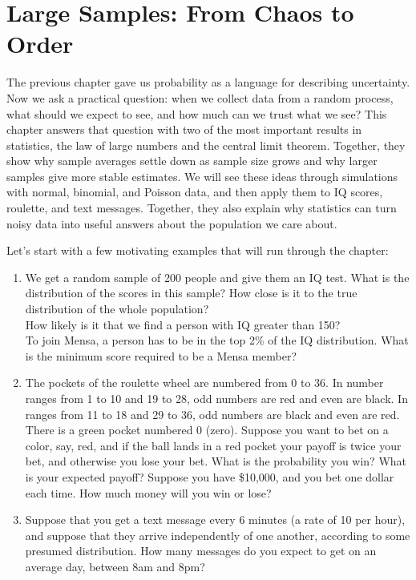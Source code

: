 
\chapter{Large Samples: From Chaos to Order}\label{ch:llnclt}
The previous chapter gave us probability as a language for describing
uncertainty. Now we ask a practical question: when we collect data from a
random process, what should we expect to see, and how much can we trust what
we see? This chapter answers that question with two of the most important
results in statistics, the law of large numbers and the central limit theorem.
Together, they show why sample averages settle down as sample size grows and
why larger samples give more stable estimates. We will see these ideas through
simulations with normal, binomial, and Poisson data, and then apply them to IQ
scores, roulette, and text messages. Together, they also explain why statistics
can turn noisy data into useful answers about the population we care about.

Let's start with a few motivating examples that will run through the chapter:
\begin{enumerate}
\item We get a random sample of 200 people and give them an IQ test. What is
the distribution of the scores in this sample? How close is it to the true
distribution of the whole population?\\ How likely is it that we find a person
with IQ greater than 150?\\
To join Mensa, a person has to be in the top 2\% of the IQ distribution. What
is the minimum score required to be a Mensa member?  \item The pockets of the
roulette wheel are numbered from 0 to 36. In
number ranges from 1 to 10 and 19 to 28, odd numbers are red and even are
black. In ranges from 11 to 18 and 29 to 36, odd numbers are black and even are
red. There is a green pocket numbered 0 (zero). Suppose you want to bet on a
color, say, red, and if the ball lands in a red pocket your payoff is twice
your bet, and otherwise you lose your bet. What is the probability you win?
What is your expected payoff? Suppose you have \$10,000, and you bet one dollar
each time. How much money will you win or lose?
\item Suppose that you get a text message every 6 minutes (a rate of 10 per
hour), and suppose that they arrive independently of one another, according to
some presumed distribution. How many messages do you expect to get on an
average day, between 8am and 8pm? 
\end{enumerate}

